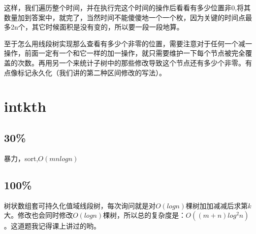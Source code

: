 \documentclass{article}
\begin{document}
			这样，我们遍历整个时间，并在执行完这个时间的操作后看看有多少位置非0,将其数量加到答案中，就完了，当然时间不能傻傻地一个一个枚，因为关键的时间点最多2n个，其它时候面积是没有变的，所以要一段一段地算。
			
			至于怎么用线段树实现那么查看有多少个非零的位置，需要注意对于任何一个减一操作，前面一定有一个和它一样的加一操作，就只需要维护一下每个节点被完全覆盖的次数。再用另一个来统计子树中的那些修改导致这个节点还有多少个非零。有点像标记永久化（我们讲的第二种区间修改的写法）。
			
						
						\newpage
						
	\section{intkth}
		\subsection{30\%}
			暴力，sort,$O(mnlogn)$
		\subsection{100\%}
			树状数组套可持久化值域线段树，每次询问就是对$O(logn)$棵树加加减减后求第$k$大。修改也会同时修改$O(logn)$棵树，所以总的复杂度是：$O((m+n)log^2n)$。这道题我记得课上讲过的哟。
			
						
			\newpage
						
\end{document}
